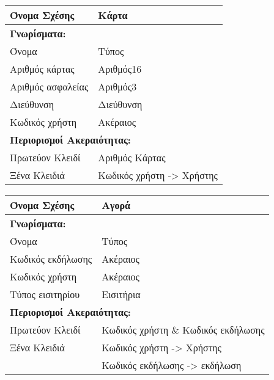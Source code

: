 \begin{tabular}{|p{6cm}|p{8cm}|}
  \hline
  Όνομα Σχέσης      & Κάρτα                                \\ \hline
  \multicolumn{2}{|l|}{\textbf{Γνωρίσματα:}}               \\ \hline
  Όνομα             & Τύπος                                \\ \hline
  Αριθμός κάρτας    & Αριθμός16                            \\ \hline
  Αριθμός ασφαλείας & Αριθμός3                             \\ \hline
  Διεύθυνση         & Διεύθυνση                            \\ \hline
  Κωδικός χρήστη    & Ακέραιος                             \\ \hline
  \multicolumn{2}{|l|}{\textbf{Περιορισμοί Ακεραιότητας:}} \\ \hline
  Πρωτεύον Κλειδί   & Αριθμός Κάρτας                       \\ \hline
  Ξένα Κλειδιά      & Κωδικός χρήστη -> Χρήστης            \\ \hline
\end{tabular}

\begin{tabular}{|p{6cm}|p{8cm}|}
  \hline
  Όνομα Σχέσης      & Αγορά                                \\ \hline
  \multicolumn{2}{|l|}{\textbf{Γνωρίσματα:}}               \\ \hline
  Όνομα             & Τύπος                                \\ \hline
  Κωδικός εκδήλωσης & Ακέραιος                             \\ \hline
  Κωδικός χρήστη    & Ακέραιος                             \\ \hline
  Τύπος εισιτηρίου  & Εισιτήρια                            \\ \hline
  \multicolumn{2}{|l|}{\textbf{Περιορισμοί Ακεραιότητας:}} \\ \hline
  Πρωτεύον Κλειδί   & Κωδικός χρήστη \& Κωδικός εκδήλωσης  \\ \hline
  Ξένα Κλειδιά      & Κωδικός χρήστη -> Χρήστης            \\ \hline
                    & Κωδικός εκδήλωσης -> εκδήλωση        \\ \hline
\end{tabular}

